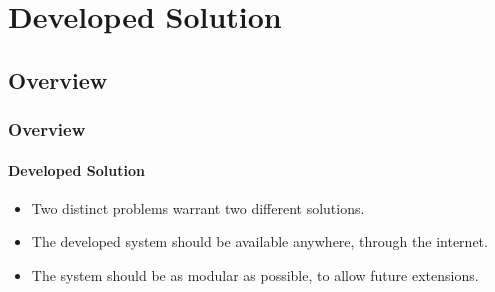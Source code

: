 \documentclass{beamer}
\begin{document}
\begin{frame}

\end{frame}


\section{Developed Solution}
\subsection{Overview}
\begin{frame}
  \frametitle{Overview}
  \framesubtitle{Developed Solution}

\begin{itemize}

\item
Two distinct problems warrant two different solutions.\\ \vspace{0.8cm}

\item
The developed system should be available anywhere, through the internet.\\ \vspace{0.8cm}

\item
The system should be as modular as possible, to allow future extensions.

\end{itemize}


\end{frame}
\end{document}
